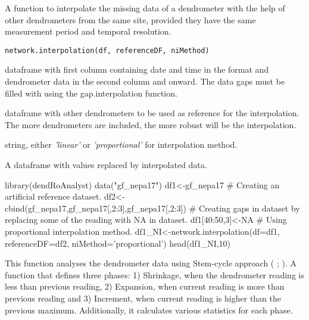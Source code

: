 \documentclass[a4paper]{book}
\begin{document}
%
\begin{Description}\relax
A function to interpolate the missing data of a dendrometer with the help of other dendrometers from the same site, provided they have the same measurement period and temporal resolution.
\end{Description}
%
\begin{Usage}
\begin{verbatim}
network.interpolation(df, referenceDF, niMethod)
\end{verbatim}
\end{Usage}
%
\begin{Arguments}
\begin{ldescription}
\item[\code{df}] dataframe with first column containing date and time in the format  and dendrometer data in the second column and onward. The data gaps must be filled with  using the gap.interpolation function.

\item[\code{referenceDF}] dataframe with other dendrometers to be used as reference for the interpolation. The more dendrometers are included, the more robust will be the interpolation.

\item[\code{niMethod}] string, either \emph{'linear'} or \emph{'proportional'} for interpolation method.
\end{ldescription}
\end{Arguments}
%
\begin{Value}
A dataframe with  values replaced by interpolated data.
\end{Value}
%
\begin{Examples}
\begin{ExampleCode}
library(dendRoAnalyst)
data("gf_nepa17")
df1<-gf_nepa17
# Creating an artificial reference dataset.
df2<-cbind(gf_nepa17,gf_nepa17[,2:3],gf_nepa17[,2:3])
# Creating gaps in dataset by replacing some of the reading with NA in dataset.
df1[40:50,3]<-NA
# Using proportional interpolation method.
df1_NI<-network.interpolation(df=df1, referenceDF=df2, niMethod='proportional')
head(df1_NI,10)

\end{ExampleCode}
\end{Examples}
%
\begin{Description}\relax
This function analyses the dendrometer data using Stem-cycle approach ( ;  ). A function that defines three phases: 1) Shrinkage, when the dendrometer reading is less than previous reading, 2) Expansion, when current reading is more than previous reading and 3) Increment, when current reading is higher than the previous maximum. Additionally, it calculates various statistics for each phase.
\end{Description}
\end{document}
